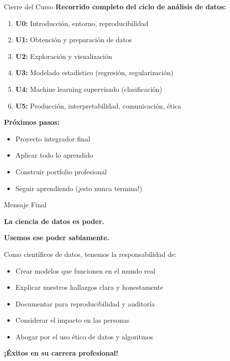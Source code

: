 \documentclass[aspectratio=169]{beamer}
\begin{document}
\begin{frame}{Cierre del Curso}
\textbf{Recorrido completo del ciclo de análisis de datos:}

\begin{enumerate}
\item \textbf{U0:} Introducción, entorno, reproducibilidad
\item \textbf{U1:} Obtención y preparación de datos
\item \textbf{U2:} Exploración y visualización
\item \textbf{U3:} Modelado estadístico (regresión, regularización)
\item \textbf{U4:} Machine learning supervisado (clasificación)
\item \textbf{U5:} Producción, interpretabilidad, comunicación, ética
\end{enumerate}

\vspace{0.3cm}

\textbf{Próximos pasos:}
\begin{itemize}
\item Proyecto integrador final
\item Aplicar todo lo aprendido
\item Construir portfolio profesional
\item Seguir aprendiendo (¡esto nunca termina!)
\end{itemize}
\end{frame}

\begin{frame}{Mensaje Final}
\begin{center}
\Large
\textbf{La ciencia de datos es poder.}

\vspace{0.5cm}

\textbf{Usemos ese poder sabiamente.}

\vspace{1cm}

\normalsize
Como científicos de datos, tenemos la responsabilidad de:
\begin{itemize}
\item Crear modelos que funcionen en el mundo real
\item Explicar nuestros hallazgos clara y honestamente
\item Documentar para reproducibilidad y auditoría
\item Considerar el impacto en las personas
\item Abogar por el uso ético de datos y algoritmos
\end{itemize}

\vspace{0.5cm}

\textbf{¡Éxitos en su carrera profesional!}
\end{center}
\end{frame}
\end{document}
